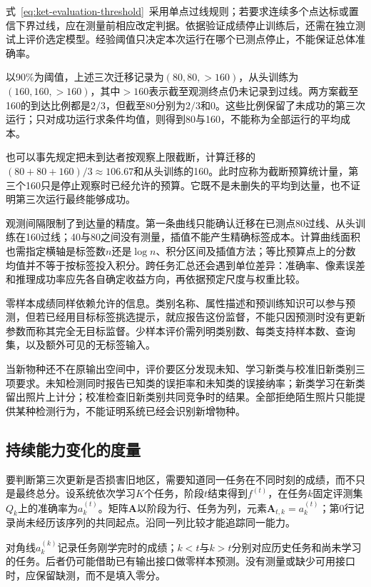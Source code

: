 式~\eqref{eq:ket-evaluation-threshold}~采用单点过线规则；若要求连续多个点达标或置信下界过线，应在测量前相应改定判据。依据验证成绩停止训练后，还需在独立测试上评价选定模型。经验阈值只决定本次运行在哪个已测点停止，不能保证总体准确率。

以90\%为阈值，上述三次迁移记录为$(80,80,>160)$，从头训练为$(160,160,>160)$，其中$>160$表示截至观测终点仍未记录到过线。两方案截至160的到达比例都是$2/3$，但截至80分别为$2/3$和0。这些比例保留了未成功的第三次运行；只对成功运行求条件均值，则得到80与160，不能称为全部运行的平均成本。

也可以事先规定把未到达者按观察上限截断，计算迁移的$(80+80+160)/3\approx106.67$和从头训练的160。此时应称为截断预算统计量，第三个160只是停止观察时已经允许的预算。它既不是未删失的平均到达量，也不证明第三次运行最终能够成功。

观测间隔限制了到达量的精度。第一条曲线只能确认迁移在已测点80过线、从头训练在160过线；40与80之间没有测量，插值不能产生精确标签成本。计算曲线面积也需指定横轴是标签数$n$还是$\log n$、积分区间及插值方法；等比预算点上的分数均值并不等于按标签投入积分。跨任务汇总还会遇到单位差异：准确率、像素误差和推理成功率应先各自确定收益方向，再依据预定尺度与权重比较。

零样本成绩同样依赖允许的信息。类别名称、属性描述和预训练知识可以参与预测，但若已经用目标标签挑选提示，就应报告这份监督，不能只因预测时没有更新参数而称其完全无目标监督。少样本评价需列明类别数、每类支持样本数、查询集，以及额外可见的无标签输入。

当新物种还不在原输出空间中，评价要区分发现未知、学习新类与校准旧新类别三项要求。未知检测同时报告已知类的误拒率和未知类的误接纳率；新类学习在新类留出照片上计分；校准检查旧新类别共同竞争时的结果。全部拒绝陌生照片只能提供某种检测行为，不能证明系统已经会识别新增物种。

\subsection{持续能力变化的度量}
\label{sec:ket-evaluation-continuous}

要判断第三次更新是否损害旧地区，需要知道同一任务在不同时刻的成绩，而不只是最终总分。设系统依次学习$K$个任务，阶段$t$结束得到$f^{(t)}$，在任务$k$固定评测集$Q_k$上的准确率为$a_k^{(t)}$。矩阵$\bm A$以阶段为行、任务为列，元素$\bm A_{t,k}=a_k^{(t)}$；第0行记录尚未经历该序列的共同起点。沿同一列比较才能追踪同一能力。

对角线$a_k^{(k)}$记录任务刚学完时的成绩；$k<t$与$k>t$分别对应历史任务和尚未学习的任务。后者仍可能借助已有输出接口做零样本预测。没有测量或缺少可用接口时，应保留缺测，而不是填入零分。

